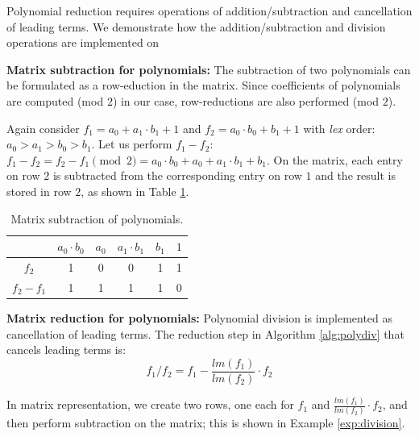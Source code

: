 Polynomial reduction requires operations of addition/subtraction and
cancellation of leading terms. We demonstrate how the
addition/subtraction and division operations are implemented on

{\bf Matrix subtraction for polynomials:} The subtraction of two
polynomials can be formulated as a row-eduction in the matrix. Since
coefficients of polynomials are computed (mod $2$) in our case,
row-reductions are also performed (mod $2$). 
	
\begin{Example}	
	Again consider $f_{1}=a_{0}+a_{1}\cdot b_{1}+1$ and
        $f_{2}=a_{0}\cdot b_{0}+b_{1}+1$ with {\it lex} order:
        $a_{0}>a_{1}>b_{0}>b_{1}$. 
	Let us perform $f_{1}-f_{2}$: %
	$f_{1}-f_{2}=f_{2}-f_{1} \pmod 2=a_{0}\cdot b_{0}+a_{0}+a_{1}\cdot b_{1}+b_{1}$.
	On the matrix, each entry on row $2$ is subtracted from %
        the corresponding entry on row $1$ and the result is stored in row
        $2$, as shown in Table \ref{tab:subtract}.
	
	 \begin{table}[b]
	\begin{center}
	\caption{Matrix subtraction of polynomials.}
	\label{tab:subtract}
	\begin{tabular}{|c|c|c|c|c|c|} \hline 
			& $a_{0}\cdot b_{0}$  & $a_{0}$ & $a_{1}\cdot b_{1}$ & $b_{1}$ & $1$  \\
	\hline 
	$f_{2}$ & 1 &0 & 0 & 1 & 1 \\
	\hline
	$f_2 - f_{1}$ & 1 &1 & 1 & 1 & 0 \\
	\hline
	\end{tabular}
	\end{center}
	\end{table}
	
\end{Example}

{\bf Matrix reduction for polynomials:} Polynomial
division is implemented as cancellation of leading terms. The
reduction step in Algorithm \ref{alg:polydiv} that cancels leading
terms is:   
\begin{equation}
\label{eqn:mat-red}
	{f_1}/{f_2}=f_{1}-\frac{lm(f_1)}{lm(f_2)}\cdot f_{2} 
\end{equation}
 
In matrix representation, 
we create two rows, one each for $f_{1}$ and $\frac{lm(f_1)}{lm(f_2)}\cdot f_{2}$,
and then perform subtraction on the matrix; this is shown in Example
\ref{exp:division}.  
 
